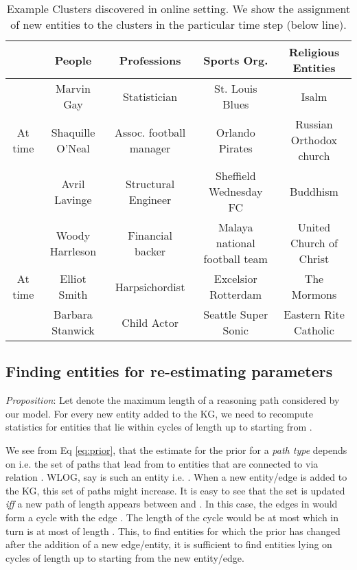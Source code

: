 \documentclass[11pt,a4paper]{article}
\begin{document}
\begin{table*}
\footnotesize
    \centering
    \begin{tabular}{c c c c c }
         \toprule
         &\bf People & \bf Professions & \bf Sports Org. & \bf Religious Entities  \\
         \midrule
         & Marvin Gay & Statistician & St. Louis Blues & Isalm \\
         At time &Shaquille O’Neal & Assoc. football manager  & Orlando Pirates  & Russian Orthodox church \\
          &Avril Lavinge & Structural Engineer & Sheffield Wednesday FC & Buddhism\\
         &Woody Harrleson & Financial backer & Malaya national football team & United Church of Christ \\
         \midrule
         \midrule
       At time & Elliot Smith & Harpsichordist &  Excelsior Rotterdam &  The Mormons  \\
         & Barbara Stanwick  & Child Actor &  Seattle Super Sonic &  Eastern Rite Catholic\\
         \bottomrule
    \end{tabular}
    \caption{Example Clusters discovered in online setting. We show the assignment of new entities to the clusters in the particular time step (below line).}
    \label{tab:appendix_cluster_eye_candy}
\end{table*} 

\subsection{Finding entities for re-estimating parameters}
\label{sub:appendix_estimate_params}
\textit{Proposition}: Let  denote the maximum length of a reasoning path considered by our model. For every new entity  added to the KG, we need to recompute statistics for entities that lie within cycles of length up to  starting from .

We see from Eq \ref{eq:prior}, that the estimate for the prior for a \textit{path type}  depends on  i.e. the set of paths that lead from  to entities that are connected to  via relation . WLOG, say  is such an entity i.e. . When a new entity/edge is added to the KG, this set of paths might increase. It is easy to see that the set  is updated \textit{iff} a new path  of length  appears between  and . In this case, the edges in  would form a cycle with the edge . The length of the cycle would be at most  which in turn is at most of length . This, to find entities for which the prior has changed after the addition of a new edge/entity, it is sufficient to find entities lying on cycles of length up to  starting from the new entity/edge.
\end{document}
